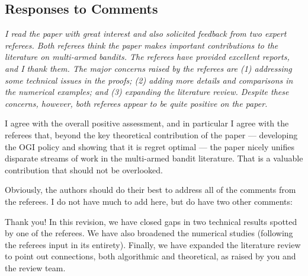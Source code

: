 \documentclass[11pt]{article}
\newcommand{\1}{\ensuremath{\mathbf{1}}} %
\theoremstyle{thm-sf}
\begin{document}
	\subsection{Responses to Comments}
	{\it I read the paper with great interest and also solicited feedback from two expert referees. Both referees think the paper makes important contributions to the literature on multi-armed bandits. The referees have provided excellent reports, and I thank them. The major concerns raised by the referees are (1) addressing some technical issues in the proofs; (2) adding more details and comparisons in the numerical examples; and (3) expanding the literature review. Despite these concerns, however, both referees appear to be quite positive on the paper.
		
	I agree with the overall positive assessment, and in particular I agree with the referees that, beyond the key theoretical contribution of the paper --- developing the OGI policy and showing that it is regret optimal --- the paper nicely unifies disparate streams of work in the multi-armed bandit literature. That is a valuable contribution that should not be overlooked.
	
	Obviously, the authors should do their best to address all of the comments from the referees. I do not have much to add here, but do have two other comments:
	} 
\newline
\newline
Thank you! In this revision, we have closed gaps in two technical results spotted by one of the referees. We have also broadened the numerical studies (following the referees input in its entirety). Finally, we have expanded the literature review to point out connections, both algorithmic and theoretical, as raised by you and the review team.  
\end{document}
